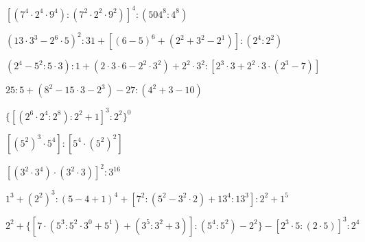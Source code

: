 \begin{esercizio} %
\([(7^4\cdot2^4\cdot9^4):(7^2\cdot2^2\cdot9^2)]^4:(504^8:4^8)\) 
\end{esercizio}
\begin{esercizio} %
\((13\cdot3^3-2^6\cdot5)^2:31+[(6-5)^6+(2^2+3^2-2^1)]:(2^4:2^2)\) 
\end{esercizio}
\begin{esercizio} %
\((2^4-5^2:5\cdot3):1+(2\cdot3\cdot6-2^2\cdot3^2)+2^2\cdot3^2:
[2^3\cdot3+2^2\cdot3\cdot(2^3-7)]\) 
\end{esercizio}
\begin{esercizio} %
\(25:5+(8^2-15\cdot3-2^3)-27:(4^2+3-10)\) 
\end{esercizio}
\begin{esercizio} %
\(\{[(2^6\cdot2^4:2^8):2^2+1]^3:2^2\}^0\) 
\end{esercizio}
\begin{esercizio} %
\([(5^2)^3\cdot5^4]:[5^4\cdot(5^2)^2]\) 
\end{esercizio}
\begin{esercizio} %
\([(3^2\cdot3^4)\cdot(3^2\cdot3)]^2:3^{16}\) 
\end{esercizio}
\begin{esercizio} %
\(1^3+(2^2)^3:(5-4+1)^4+[7^2:(5^2-3^2\cdot2)+13^4:13^3]:2^2+1^5\) 
\end{esercizio}
\begin{esercizio} %
\(2^2+\{[7\cdot(5^3:5^2\cdot3^0+5^1)+(3^5:3^2+3)]:(5^4:5^2)-2^2\}-
[2^3\cdot5:(2\cdot5)]^3:2^4\) 
\end{esercizio}
% 


